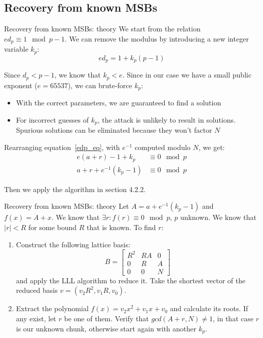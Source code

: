 \documentclass[usepdftitle=false]{beamer}
\begin{document}
\subsection{Recovery from known MSBs}
\begin{frame}{Recovery from known MSBs: theory}\label{427_msb_alg}
We start from the relation $e d_p \equiv 1 \mod p-1$. We can remove the modulus by 
introducing a new integer variable $k_p$:
\begin{equation}
e d_p = 1 + k_p (p-1) \label{edp_eq}
\end{equation}

Since $d_p < p-1$, we know that $k_p < e$. Since in our case we have a small public
exponent ($e = 65537$), we can brute-force $k_p$:
\begin{itemize}
    \item With the correct parameters, we are guaranteed to find a solution
    \item For incorrect guesses of $k_p$, the attack is unlikely to result in solutions.
          Spurious solutions can be eliminated because they won't factor $N$
\end{itemize}

Rearranging equation~\ref{edp_eq}, with $e^{-1}$ computed modulo $N$, we get:
\begin{align}
    e(a+r) - 1 + k_p        &\equiv 0 \mod p \\
    a + r + e^{-1}(k_p - 1) &\equiv 0 \mod p\label{427_eqn}
\end{align}

Then we apply the algorithm in section 4.2.2.
\end{frame}
\begin{frame}{Recovery from known MSBs: theory}\label{422_alg}
Let $A = a + e^{-1}(k_p - 1)$ and $f(x) = A + x$. We know that $\exists r: f(r) \equiv 0 \mod p$,
$p$ unknown. We know that $|r| < R$ for some bound $R$ that is known. To find $r$:
\begin{enumerate}
    \item Construct the following lattice basis:
            \begin{equation}\label{422_lattice}
                B = \begin{bmatrix}
                    R^2 & RA & 0 \\
                    0   & R  & A \\
                    0   & 0  & N
                \end{bmatrix}
            \end{equation}
          and apply the LLL algorithm to reduce it. Take the shortest vector of the reduced
          basis $v = (v_2 R^2, v_1 R, v_0)$.
    \item Extract the polynomial $f(x) = v_2 x^2 + v_1 x + v_0$ and calculate its roots.
          If any exist, let $r$ be one of them. Verify that $gcd(A + r, N) \neq 1$, 
          in that case $r$ is our unknown chunk, otherwise start again with another $k_p$.
\end{enumerate}
\end{frame}
\end{document}
